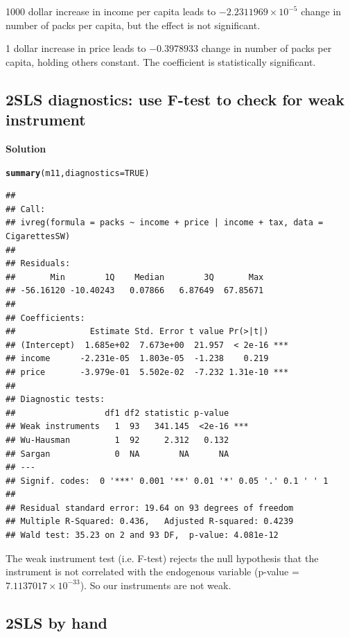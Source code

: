 \documentclass{article}\usepackage[]{graphicx}\usepackage[]{color}
\makeatletter
\newcommand{\hlnum}[1]{\textcolor[rgb]{0.686,0.059,0.569}{#1}}%
\newcommand{\hlstd}[1]{\textcolor[rgb]{0.345,0.345,0.345}{#1}}%
\newcommand{\hlkwc}[1]{\textcolor[rgb]{0.333,0.667,0.333}{#1}}%
\newcommand{\hlkwd}[1]{\textcolor[rgb]{0.737,0.353,0.396}{\textbf{#1}}}%
\newenvironment{kframe}{%
 \def\at@end@of@kframe{}%
 \ifinner\ifhmode%
  \def\at@end@of@kframe{\end{minipage}}%
  \begin{minipage}{\columnwidth}%
 \fi\fi%
 \def\FrameCommand##1{\hskip\@totalleftmargin \hskip-\fboxsep
 \colorbox{shadecolor}{##1}\hskip-\fboxsep
     \hskip-\linewidth \hskip-\@totalleftmargin \hskip\columnwidth}%
 \MakeFramed {\advance\hsize-\width
   \@totalleftmargin\z@ \linewidth\hsize
   \@setminipage}}%
 {\par\unskip\endMakeFramed%
 \at@end@of@kframe}
\newenvironment{knitrout}{}{} %
\makeatother
\begin{document}
1000 dollar increase in income per capita leads to \ensuremath{-2.2311969\times 10^{-5}} change in number of packs per capita, but the effect is not significant.

1 dollar increase in price leads to \ensuremath{-0.3978933} change in number of packs per capita, holding others constant. The coefficient is statistically significant.

\subsection{2SLS diagnostics: use F-test to check for weak instrument}

\textbf{Solution}

\begin{knitrout}
\color{fgcolor}\begin{kframe}
\begin{alltt}
\hlkwd{summary}\hlstd{(m11,} \hlkwc{diagnostics} \hlstd{=} \hlnum{TRUE}\hlstd{)}
\end{alltt}
\begin{verbatim}
## 
## Call:
## ivreg(formula = packs ~ income + price | income + tax, data = CigarettesSW)
## 
## Residuals:
##       Min        1Q    Median        3Q       Max 
## -56.16120 -10.40243   0.07866   6.87649  67.85671 
## 
## Coefficients:
##               Estimate Std. Error t value Pr(>|t|)    
## (Intercept)  1.685e+02  7.673e+00  21.957  < 2e-16 ***
## income      -2.231e-05  1.803e-05  -1.238    0.219    
## price       -3.979e-01  5.502e-02  -7.232 1.31e-10 ***
## 
## Diagnostic tests:
##                  df1 df2 statistic p-value    
## Weak instruments   1  93   341.145  <2e-16 ***
## Wu-Hausman         1  92     2.312   0.132    
## Sargan             0  NA        NA      NA    
## ---
## Signif. codes:  0 '***' 0.001 '**' 0.01 '*' 0.05 '.' 0.1 ' ' 1
## 
## Residual standard error: 19.64 on 93 degrees of freedom
## Multiple R-Squared: 0.436,	Adjusted R-squared: 0.4239 
## Wald test: 35.23 on 2 and 93 DF,  p-value: 4.081e-12
\end{verbatim}
\end{kframe}
\end{knitrout}

The weak instrument test (i.e. F-test) rejects the null hypothesis that the instrument is not correlated with the endogenous variable (p-value = \ensuremath{7.1137017\times 10^{-33}}). So our instruments are not weak.

\subsection{2SLS by hand}
\end{document}
